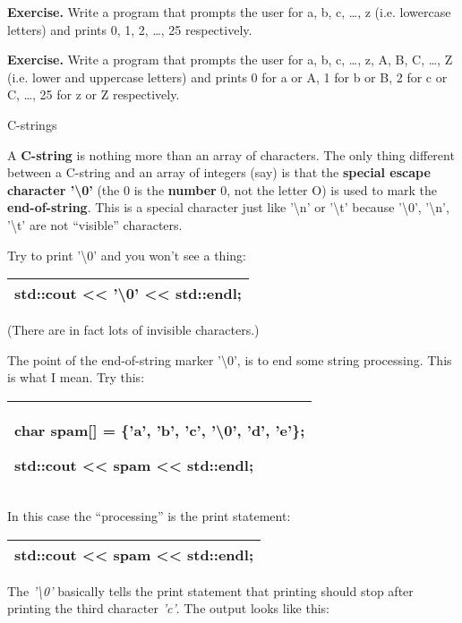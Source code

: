 \documentclass[
]{article}
\begin{document}
\textbf{Exercise.} Write a program that prompts the user for a, b, c,
\ldots, z (i.e. lowercase letters) and prints 0, 1, 2, \ldots, 25
respectively.

\textbf{Exercise.} Write a program that prompts the user for a, b, c,
\ldots, z, A, B, C, \ldots, Z (i.e. lower and uppercase letters) and
prints 0 for a or A, 1 for b or B, 2 for c or C, \ldots, 25 for z or Z
respectively.

C-strings

A \textbf{C-string} is nothing more than an array of characters. The
only thing different between a C-string and an array of integers (say)
is that the \textbf{special escape character '\textbackslash0'} (the 0
is the \textbf{number} 0, not the letter O) is used to mark the
\textbf{end-of-string}. This is a special character just like
'\textbackslash n' or '\textbackslash t' because '\textbackslash0',
'\textbackslash n', '\textbackslash t' are not ``visible'' characters.

Try to print '\textbackslash0' and you won't see a thing:

\begin{longtable}[]{@{}l@{}}
\toprule
\endhead
std::cout \textless\textless{} '\textbackslash0' \textless\textless{}
std::endl;\tabularnewline
\bottomrule
\end{longtable}

(There are in fact lots of invisible characters.)

The point of the end-of-string marker '\textbackslash0', is to end some
string processing. This is what I mean. Try this:

\begin{longtable}[]{@{}l@{}}
\toprule
\endhead
\begin{minipage}[t]{0.97\columnwidth}\raggedright
char spam{[}{]} = \{'a', 'b', 'c', '\textbackslash0', 'd', 'e'\};

std::cout \textless\textless{} spam \textless\textless{}
std::endl;\strut
\end{minipage}\tabularnewline
\bottomrule
\end{longtable}

In this case the ``processing'' is the print statement:

\begin{longtable}[]{@{}l@{}}
\toprule
\endhead
std::cout \textless\textless{} spam \textless\textless{}
std::endl;\tabularnewline
\bottomrule
\end{longtable}

The \emph{'\textbackslash0'} basically tells the print statement that
printing should stop after printing the third character \emph{'c'}. The
output looks like this:
\end{document}
